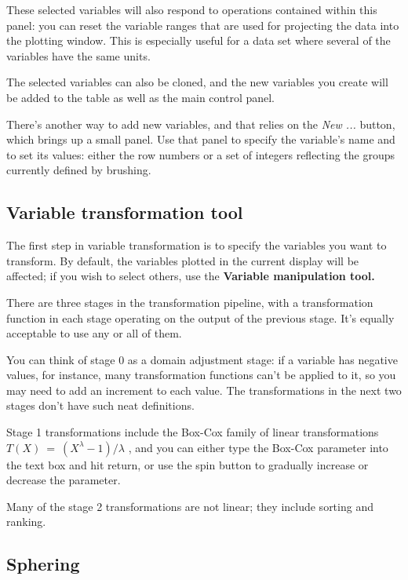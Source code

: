 \documentclass[11pt]{article}
\begin{document}
These selected variables will also respond to operations contained
within this panel:  you can reset the variable ranges that are used
for projecting the data into the plotting window.  This is especially
useful for a data set where several of the variables have the same units.

The selected variables can also be cloned, and the new variables
you create will be added to the table as well as the main control panel.

\label{NewVariable}
There's another way to add new variables, and that relies on the {\em New
...} button, which brings up a small panel.  Use that panel to specify
the variable's name and to set its values:  either the row numbers or
a set of integers reflecting the groups currently defined by brushing.

\subsection{Variable transformation tool}
\label{slbl:VarTransform}

The first step in variable transformation is to specify the variables
you want to transform.  By default, the variables plotted in the
current display will be affected; if you wish to select others, use
the {\bf Variable manipulation tool.}

There are three stages in the transformation pipeline, with a
transformation function in each stage operating on the output of the
previous stage.  It's equally acceptable to use any or all of them.

You can think of stage 0 as a domain adjustment stage:  if a variable
has negative values, for instance, many transformation functions
can't be applied to it, so you may need to add an increment to each
value.  The transformations in the next two stages don't have such
neat definitions. 

Stage 1 transformations include the Box-Cox family of linear
transformations \( T(X)~=~(X ^ \lambda - 1) / \lambda\) \cite{BoxCox64},
and you can either type the Box-Cox parameter into
the text box and hit return, or use the spin button to gradually
increase or decrease the parameter. 

Many of the stage 2
transformations are not linear; they include sorting and ranking.

\subsection{Sphering}
\label{slbl:Sphering}
\end{document}
